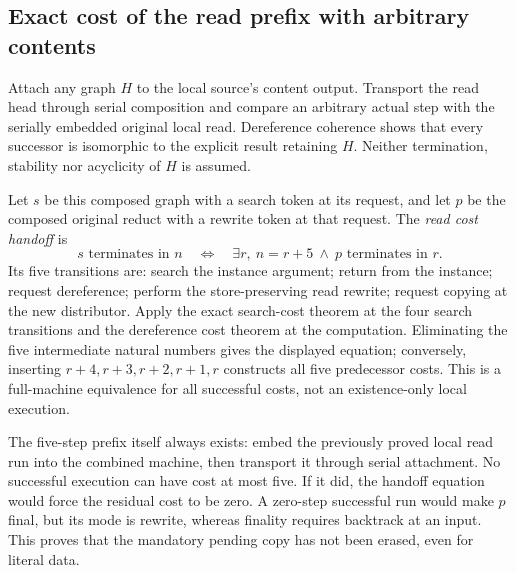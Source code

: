 


\subsection{Exact cost of the read prefix with arbitrary contents}

Attach any graph $H$ to the local source's content output. Transport the
read head through serial composition and compare an arbitrary actual step
with the serially embedded original local read. Dereference coherence shows
that every successor is isomorphic to the explicit result retaining $H$.
Neither termination, stability nor acyclicity of $H$ is assumed.


Let $s$ be this composed graph with a search token at its request, and let
$p$ be the composed original reduct with a rewrite token at that request.
The \emph{read cost handoff} is
\[
 s\text{ terminates in }n
 \quad\Longleftrightarrow\quad
 \exists r,\ n=r+5\ \land\ p\text{ terminates in }r.
\]
Its five transitions are: search the instance argument; return from the
instance; request dereference; perform the store-preserving read rewrite;
request copying at the new distributor. Apply the exact search-cost theorem
at the four search transitions and the dereference cost theorem at the
computation. Eliminating the five intermediate natural numbers gives the
displayed equation; conversely, inserting $r+4,r+3,r+2,r+1,r$ constructs
all five predecessor costs. This is a full-machine equivalence for all
successful costs, not an existence-only local execution.


The five-step prefix itself always exists: embed the previously proved
local read run into the combined machine, then transport it through serial
attachment. No successful execution can have cost at most five. If it did,
the handoff equation would force the residual cost to be zero. A zero-step
successful run would make $p$ final, but its mode is rewrite, whereas finality
requires backtrack at an input. This proves that the mandatory pending copy
has not been erased, even for literal data.

